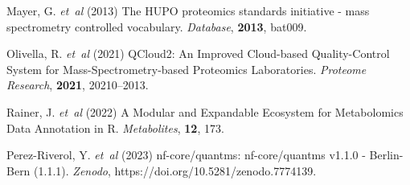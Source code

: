 \documentclass[unnumsec,webpdf,contemporary,large]{oup-authoring-template}%
\theoremstyle{thmstyleone}%
\theoremstyle{thmstyletwo}%
\theoremstyle{thmstylethree}%
\begin{document}
\begin{thebibliography}{10}
Mayer, G. \textit{et~al} (2013) The HUPO proteomics standards initiative - 
mass spectrometry controlled vocabulary.
\textit{Database}, \textbf{2013}, bat009.

Olivella, R. \textit{et~al} (2021) QCloud2: An Improved Cloud-based 
Quality-Control System for Mass-Spectrometry-based Proteomics Laboratories.
\textit{Proteome Research}, \textbf{2021}, 20210--2013.


Rainer, J. \textit{et~al} (2022) A Modular and Expandable Ecosystem for Metabolomics Data Annotation in R.
\textit{Metabolites}, \textbf{12}, 173.

Perez-Riverol, Y. \textit{et~al} (2023) nf-core/quantms: nf-core/quantms v1.1.0 - Berlin-Bern (1.1.1).
\textit{Zenodo}, https://doi.org/10.5281/zenodo.7774139.

\end{thebibliography}


%
%
\end{document}
